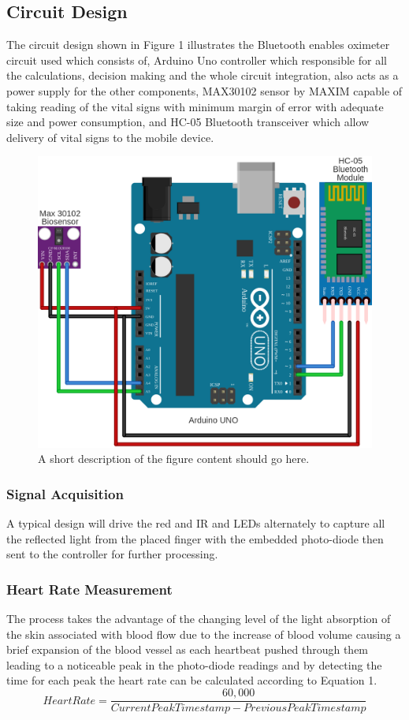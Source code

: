 \documentclass{bmcart}
\begin{document}
\subsection*{Circuit Design}
The circuit design shown in Figure 1 illustrates the Bluetooth enables oximeter
circuit used which consists of,  Arduino Uno controller which responsible for
all the calculations, decision making and the whole circuit integration, also
acts as a power supply for the other components, MAX30102 sensor by MAXIM
capable of taking reading of the vital signs with minimum margin of error with
adequate size and power consumption, and  HC-05 Bluetooth transceiver which
allow delivery of vital signs to the mobile device.

\begin{figure}[h!]
  \includegraphics[width=.75\linewidth]{png_images/circuit_desing.png}
  \caption{
      A short description of the figure content should go here.}
\end{figure}
\FloatBarrier

\subsubsection*{Signal Acquisition}
A typical design will drive the red and IR and LEDs alternately to capture all
the reflected light from the placed finger with the embedded photo-diode then
sent to the controller for further processing.\\

\subsubsection*{Heart Rate Measurement}
The process takes the advantage of the changing level of the light absorption of
the skin associated with blood flow due to the increase of blood volume causing
a brief expansion of the blood vessel as each heartbeat pushed through them
leading to a noticeable peak in the photo-diode readings and by detecting the
time for each peak the heart rate can be calculated according to Equation 1.\\
%
\[
 Heart Rate = \frac{60,000}{Current Peak Timestamp - Previous Peak Timestamp}
\]
%
\end{document}
